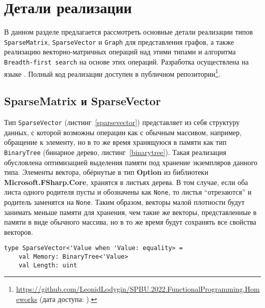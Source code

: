 
\section{Детали реализации}
В данном разделе предлагается рассмотреть основные детали реализации типов \texttt{SparseMatrix}, \texttt{SparseVector} и \texttt{Graph} для представления графов, а также реализацию векторно-матричных операций над этими типами и алгоритма \texttt{Breadth-first search} на основе этих операций. Разработка осуществлена на языке \fsharp. Полный код реализации доступен в публичном репозитории\footnote{\url{https://github.com/LeonidLodygin/SPBU.2022.FunctionalProgramming.Homeworks} (дата доступа:   ).}.

\subsection{SparseMatrix и SparseVector}
Тип \texttt{SparseVector} (листинг~\ref{sparsevector}) представляет из себя структуру данных, с которой возможны операции как с обычным массивом, например, обращение к элементу, но в то же время хранящуюся в памяти как тип \texttt{BinaryTree} (бинарное дерево, листинг~\ref{binarytree}). Такая реализация обусловлена оптимизацией выделения памяти под хранение экземпляров данного типа. Элементы вектора, обёрнутые в тип \textbf{Option} из библиотеки \textbf{Microsoft.FSharp.Core}, хранятся в листьях дерева. В том случае, если оба листа одного родителя пусты и обозначены как \texttt{None}, то листья \enquote{отрезаются} и родитель заменятся на \texttt{None}. Таким образом, векторы малой плотности будут занимать меньше памяти для хранения, чем такие же векторы, представленные в памяти в виде обычного массива, но в то же время будут сохранять все свойства векторов.


\begin{lstlisting}[style=codelistingstyle, caption={Тип SparseVector},label={sparsevector}, frame=single]
type SparseVector<'Value when 'Value: equality> =
    val Memory: BinaryTree<'Value>
    val Length: uint
\end{lstlisting}

